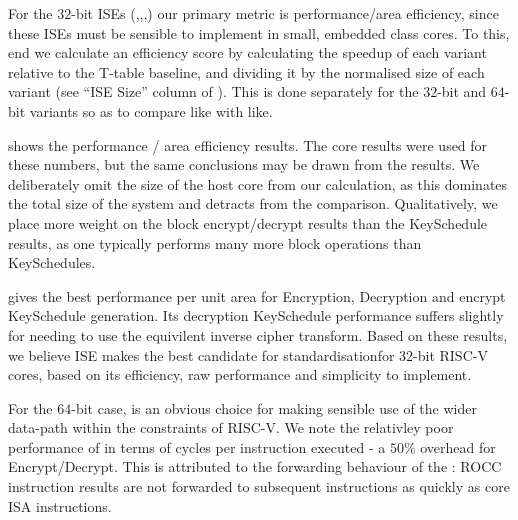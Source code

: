 
For the $32$-bit ISEs 
(,,,)
our primary metric is
performance/area efficiency, since these ISEs must be sensible to
implement in small, embedded class cores.
To this, end we calculate an efficiency score by calculating the speedup
of each variant relative to the T-table baseline, and dividing it
by the normalised size of each variant
(see ``ISE Size'' column of ).
This is done separately for the $32$-bit and $64$-bit variants so as
to compare like with like.

 shows the performance / area efficiency results.
The  core results were used for these numbers, but the
same conclusions may be drawn from the  results.
We deliberately omit the size of the host core from our calculation,
as this dominates the total size of the system and detracts from
the comparison.
Qualitatively, we place more weight on the block encrypt/decrypt results
than the KeySchedule results, as one typically performs many more
block operations than KeySchedules.

 gives the best performance per unit area
for Encryption, Decryption and encrypt KeySchedule generation.
Its decryption KeySchedule performance suffers slightly for needing
to use the equivilent inverse cipher transform.
Based on these results, we believe ISE  makes the best candidate for
standardisationfor $32$-bit RISC-V cores,
based on its efficiency, raw performance and simplicity to implement.

For the $64$-bit case,  is an obvious choice for making
sensible use of the wider data-path within the constraints of RISC-V.
We note the relativley poor performance of  in terms of cycles
per instruction executed - a $50\%$ overhead for Encrypt/Decrypt.
This is attributed to the forwarding behaviour of the :
ROCC instruction results are not
forwarded to subsequent instructions as quickly as core ISA
instructions.

